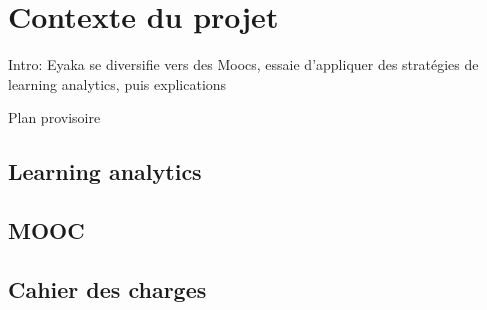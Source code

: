 \chapter{Contexte du projet}

    Intro: Eyaka se diversifie vers des Moocs, essaie d'appliquer des stratégies de learning analytics, puis explications


    Plan provisoire

    \section{Learning analytics}
    \section{MOOC}
    \section{Cahier des charges}